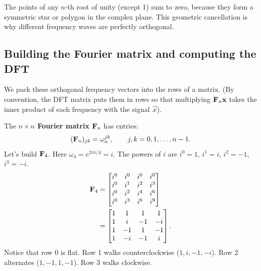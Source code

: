 \begin{intuitionbox}
The points of any $n$-th root of unity (except 1) sum to zero, because they form a symmetric star or polygon in the complex plane. This geometric cancellation is why different frequency waves are perfectly orthogonal.
\end{intuitionbox}

\subsection{Building the Fourier matrix and computing the DFT}

We pack these orthogonal frequency vectors into the rows of a matrix. (By convention, the DFT matrix puts them in rows so that multiplying $\mathbf{F}_n \mathbf{x}$ takes the inner product of each frequency with the signal $\vec x$).

The \textbf{$n \times n$ Fourier matrix} $\mathbf{F}_n$ has entries:
\[
  (\mathbf{F}_n)_{jk} = \omega_n^{jk}, \qquad j,k = 0,1,\dots,n-1.
\]
Let's build $\mathbf{F}_4$. Here $\omega_4 = e^{2\pi i/4} = i$. The powers of $i$ are $i^0=1$, $i^1=i$, $i^2=-1$, $i^3=-i$.
\begin{align*}
  \mathbf{F}_4 &= \begin{bmatrix}
    i^0 & i^0 & i^0 & i^0 \\
    i^0 & i^1 & i^2 & i^3 \\
    i^0 & i^2 & i^4 & i^6 \\
    i^0 & i^3 & i^6 & i^9
  \end{bmatrix} \\
  &= \begin{bmatrix}
    1 & 1 & 1 & 1 \\
    1 & i & -1 & -i \\
    1 & -1 & 1 & -1 \\
    1 & -i & -1 & i
  \end{bmatrix}.
\end{align*}
Notice that row 0 is flat. Row 1 walks counterclockwise ($1, i, -1, -i$). Row 2 alternates ($1, -1, 1, -1$). Row 3 walks clockwise.

